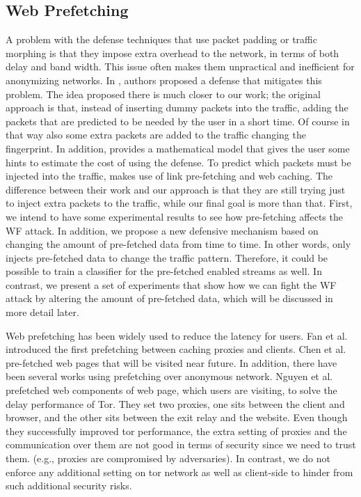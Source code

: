 \subsection{Web Prefetching}

A problem with the defense techniques that use packet padding or traffic morphing is that they impose extra
 overhead to the network, in terms of both delay and band width. This issue often makes them unpractical and inefficient for anonymizing networks. In \cite{yu10}, authors proposed a defense that mitigates this problem.
 The idea proposed there is much closer to our work; the original approach is that, instead of inserting dummy packets into the traffic, adding the packets that are predicted to be needed by the user in a short time. Of course in that way also some extra packets are added to the traffic changing the fingerprint. In addition,  \cite{yu10} provides a mathematical model that gives the user some hints to estimate the cost of using the defense. To predict which packets must be injected into the traffic, \cite{yu10}
 makes use of link pre-fetching and web caching. The difference between their work and our approach is that they are still trying just to inject extra packets to the traffic, while our final goal is more than that. First, we intend
 to have some experimental results to see how pre-fetching affects the WF attack. In addition, we propose a new defensive mechanism based on changing the amount of pre-fetched data from time to time. In other words, \cite{yu10} only injects pre-fetched data to change the traffic pattern. Therefore, it could be possible to train a classifier for the pre-fetched enabled streams as well. In contrast, we present a set of experiments that show how we can fight the WF attack by altering the amount of pre-fetched data, which will be discussed in more detail later.

Web prefetching has been widely used to reduce the latency for users. Fan et al.\cite{Fan1999} introduced the first prefetching between caching proxies and clients. Chen et al. \cite{Chen2003} pre-fetched web pages that will be visited near future. In addition, there have been several works using prefetching over anonymous network. Nguyen et al. \cite{} prefetched web components of web page, which users are visiting, to solve the delay performance of Tor. They set two proxies, one sits between the client and browser, and the other sits between the exit relay and the website. Even though they successfully improved tor performance, the extra setting of proxies and the communication over them are not good in terms of security since we need to trust them. (e.g., proxies are compromised by adversaries). In contrast, we do not enforce any additional setting on tor network as well as client-side to hinder from such additional security risks.

